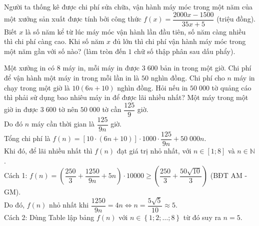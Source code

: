 \begin{ex}%
Người ta thống kê được chi phí sửa chữa, vận hành máy móc trong một năm của một xưởng sản xuất được tính bởi công thức $f(x)=\dfrac{2000x-1500}{35x+5}$ (triệu đồng). Biết $x$ là số năm kể từ lúc máy móc vận hành lần đầu tiên, số năm càng nhiều thì chi phí càng cao. Khi số năm $x$ đủ lớn thì chi phí vận hành máy móc trong một năm gần với số nào? (làm tròn đến $1$ chữ số thập phân sau dấu phẩy).
\end{ex}

\begin{ex}%
	Một xưởng in có $8$ máy in, mỗi máy in được $3\;600$ bản in trong một giờ. Chi phí để vận hành một máy in trong mỗi lần in là $50$ nghìn đồng. Chi phí cho $n$ máy in chạy trong một giờ là $10(6n+10)$ nghìn đồng. Hỏi nếu in $50\;000$ tờ quảng cáo thì phải sử dụng bao nhiêu máy in để được lãi nhiều nhất?	
	\loigiai
	{Một máy trong một giờ in được $3\;600$ tờ nên $50\;000$ tờ cần $\dfrac{125}{9}$ giờ.\\
		Do đó $n$ máy cần thời gian là $\dfrac{125}{9n}$ giờ.\\
		Tổng chi phí là $f(n)=\left[10\cdot \left(6n+10\right)\right]\cdot 1000\cdot\dfrac{125}{9n}+50\;000n$.\\
		Khi đó, để lãi nhiều nhất thì $f(n)$ đạt giá trị nhỏ nhất, với $n\in \left[1;8\right]$ và $n\in \mathbb{N}$.\\
		Cách 1: $f(n)=\left(\dfrac{250}{3}+\dfrac{1250}{9n}+5n\right)\cdot 10000\geq \left(\dfrac{250}{3}+\dfrac{50\sqrt{10}}{3}\right)$ (BĐT AM - GM).\\
		Do đó, $f(n)$ nhỏ nhất khi $\dfrac{1250}{9n}=4n\Leftrightarrow n =\dfrac{5\sqrt{5}}{10}\approx 5$.\\
		Cách 2: Dùng Table lập bảng $f(n)$ với $n\in \left\{1; 2; \ldots ; 8\right\}$ từ đó suy ra $n=5$.  
	}
\end{ex}
